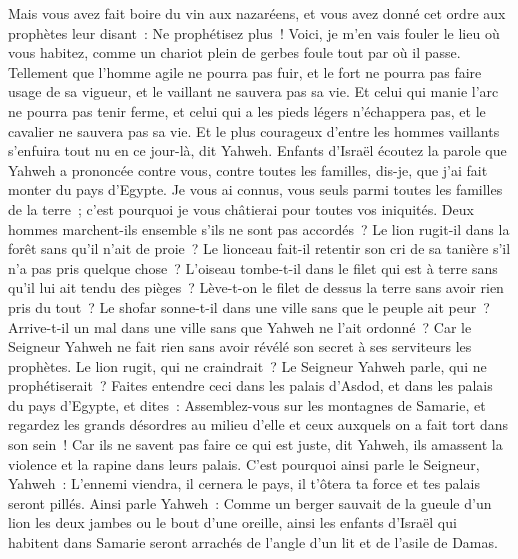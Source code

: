 \begin{multicols}{2}
Mais vous avez fait boire du vin aux nazaréens, et vous avez donné cet ordre aux prophètes leur disant~: Ne prophétisez plus~!
Voici, je m'en vais fouler le lieu où vous habitez, comme un chariot plein de gerbes foule tout par où il passe.
Tellement que l'homme agile ne pourra pas fuir, et le fort ne pourra pas faire usage de sa vigueur, et le vaillant ne sauvera pas sa vie.
Et celui qui manie l'arc ne pourra pas tenir ferme, et celui qui a les pieds légers n'échappera pas, et le cavalier ne sauvera pas sa vie.
Et le plus courageux d'entre les hommes vaillants s'enfuira tout nu en ce jour-là, dit Yahweh.
\VerseOne{}Enfants d'Israël écoutez la parole que Yahweh a prononcée contre vous, contre toutes les familles, dis-je, que j'ai fait monter du pays d'Egypte.
Je vous ai connus, vous seuls parmi toutes les familles de la terre~; c'est pourquoi je vous châtierai pour toutes vos iniquités.
Deux hommes marchent-ils ensemble s'ils ne sont pas accordés~?
Le lion rugit-il dans la forêt sans qu'il n'ait de proie~? Le lionceau fait-il retentir son cri de sa tanière s'il n'a pas pris quelque chose~?
L'oiseau tombe-t-il dans le filet qui est à terre sans qu'il lui ait tendu des pièges~? Lève-t-on le filet de dessus la terre sans avoir rien pris du tout~?
Le shofar sonne-t-il dans une ville sans que le peuple ait peur~? Arrive-t-il un mal dans une ville sans que Yahweh ne l'ait ordonné~?
Car le Seigneur Yahweh ne fait rien sans avoir révélé son secret à ses serviteurs les prophètes.
Le lion rugit, qui ne craindrait~? Le Seigneur Yahweh parle, qui ne prophétiserait~?
Faites entendre ceci dans les palais d'Asdod, et dans les palais du pays d'Egypte, et dites~: Assemblez-vous sur les montagnes de Samarie, et regardez les grands désordres au milieu d'elle et ceux auxquels on a fait tort dans son sein~!
Car ils ne savent pas faire ce qui est juste, dit Yahweh, ils amassent la violence et la rapine dans leurs palais.
C'est pourquoi ainsi parle le Seigneur, Yahweh~: L'ennemi viendra, il cernera le pays, il t'ôtera ta force et tes palais seront pillés.
Ainsi parle Yahweh~: Comme un berger sauvait de la gueule d'un lion les deux jambes ou le bout d'une oreille, ainsi les enfants d'Israël qui habitent dans Samarie seront arrachés de l'angle d'un lit et de l'asile de Damas.

\end{multicols}
